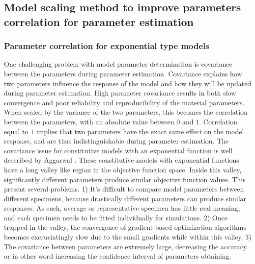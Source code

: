 \subsection{Model scaling method to improve parameters correlation for parameter estimation} \label{sec:modelscaling}

\subsubsection{Parameter correlation for exponential type models}

	One challenging problem with model parameter determination is covariance between the parameters during parameter estimation. Covariance explains how two parameters influence the response of the model and how they will be updated during parameter estimation. High parameter covariance results in both slow convergence and poor reliability and reproducibility of the material parameters. When scaled by the variance of the two parameters, this becomes the correlation between the parameters, with an absolute value between $0$ and $1$. Correlation equal to $1$ implies that two parameters have the exact same effect on the model response, and are thus indistinguishable during parameter estimation. The covariance issue for constitutive models with an exponential function is well described by Aggarwal \cite{aggarwal_inverse_2015, aggarwal_improved_2017}. These constitutive models with exponential functions have a long valley like region in the objective function space. Inside this valley, significantly different parameters produce similar objective function values. This present several problems. 1) It's difficult to compare model parameters between different specimens, because drastically different parameters can produce similar responses. As such, average or representative specimen has little real meaning, and each specimen needs to be fitted individually for simulations. 2) Once trapped in the valley, the convergence of gradient based optimization algorithms becomes excruciatingly slow due to the small gradients while within this valley. 3) The covariance between parameters are extremely large, decreasing the accuracy or in other word increasing the confidence interval of parameters obtaining. 
    

